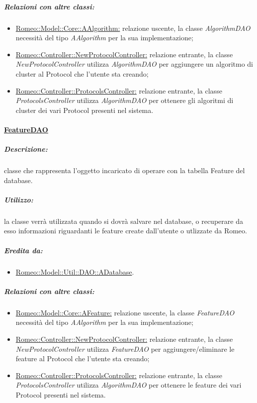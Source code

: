 				\subparagraph{Relazioni con altre classi:}
					\begin{itemize}
						
						\item \hyperref[]{Romeo::Model::Core::AAlgorithm:} relazione uscente, la classe \textsl{AlgorithmDAO} necessità del tipo \textsl{AAlgorithm} per la sua implementazione;
												
						\item \hyperref[]{Romeo::Controller::NewProtocolController:} relazione entrante, la classe \textsl{NewProtocolController} utilizza \textsl{AlgorithmDAO} per aggiungere un algoritmo di cluster\g{} al Protocol\g{} che l'utente sta creando;
												
						\item \hyperref[]{Romeo::Controller::ProtocolsController:} relazione entrante, la classe \textsl{ProtocolsController} utilizza \textsl{AlgorithmDAO} per ottenere gli algoritmi di cluster\g{} dei vari Protocol\g{} presenti nel sistema.
					\end{itemize}
					
			\paragraph{\underline{FeatureDAO}}
			\label{dao::featuredao} 
				\subparagraph{Descrizione:}  classe che rappresenta l’oggetto incaricato di operare con la tabella Feature del database.
									
				\subparagraph{Utilizzo:} la classe verrà utilizzata quando si dovrà salvare nel database, o recuperare da esso informazioni riguardanti le feature\g{} create dall'utente o utlizzate da Romeo\g{}.	
												
				\subparagraph{Eredita da:}
					\begin{itemize}
						\item \hyperref[romeo::model::util::dao]{Romeo::Model::Util::DAO::ADatabase}.			
					\end{itemize}
								
				\subparagraph{Relazioni con altre classi:}
					\begin{itemize}
						
						\item \hyperref[]{Romeo::Model::Core::AFeature:} relazione uscente, la classe \textsl{FeatureDAO} necessità del tipo \textsl{AAlgorithm} per la sua implementazione;
												
						\item \hyperref[]{Romeo::Controller::NewProtocolController:} relazione entrante, la classe \textsl{NewProtocolController} utilizza \textsl{FeatureDAO} per aggiungere/eliminare le feature\g{} al Protocol\g{} che l'utente sta creando;
												
						\item \hyperref[]{Romeo::Controller::ProtocolsController:} relazione entrante, la classe \textsl{ProtocolsController} utilizza \textsl{AlgorithmDAO} per ottenere le feature\g{} dei vari Protocol\g{} presenti nel sistema.
					\end{itemize}
			
